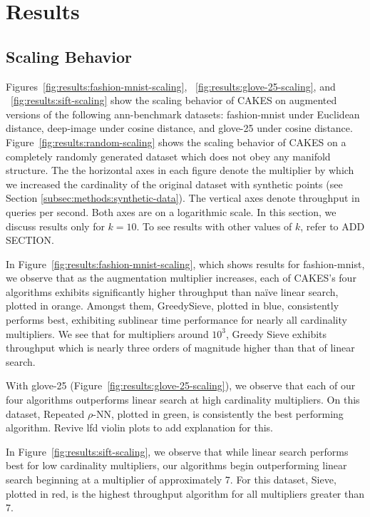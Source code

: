\section{Results}
\label{sec:results}

\subsection{Scaling Behavior}


Figures~\ref{fig:results:fashion-mnist-scaling}, ~\ref{fig:results:glove-25-scaling}, and ~\ref{fig:results:sift-scaling} show the scaling behavior of CAKES on augmented versions of the following ann-benchmark datasets: fashion-mnist under Euclidean distance, deep-image under cosine distance, and glove-25 under cosine distance. 
Figure~\ref{fig:results:random-scaling} shows the scaling behavior of CAKES on a completely randomly generated dataset which does not obey any manifold structure. 
The the horizontal axes in each figure denote the multiplier by which we increased the cardinality of the original dataset with synthetic points (see Section \ref{subsec:methods:synthetic-data}). 
The vertical axes denote throughput in queries per second. Both axes are on a logarithmic scale. In this section, we discuss results only for $k = 10$. 
To see results with other values of $k$, refer to {\color{red} ADD SECTION}.

In Figure~\ref{fig:results:fashion-mnist-scaling}, which shows results for fashion-mnist, we observe that as the augmentation multiplier increases, each of CAKES's four algorithms exhibits significantly higher throughput than na\"{i}ve linear search, plotted in orange. 
Amongst them, GreedySieve, plotted in blue, consistently performs best, exhibiting sublinear time performance for nearly all cardinality multipliers. 
We see that for multipliers around $10^3$, Greedy Sieve exhibits throughput which is nearly three orders of magnitude higher than that of linear search.


With glove-25 (Figure~\ref{fig:results:glove-25-scaling}), we observe that each of our four algorithms outperforms linear search at high cardinality multipliers. 
On this dataset, Repeated $\rho$-NN, plotted in green, is consistently the best performing algorithm. {\color{red} Revive lfd violin plots to add explanation for this.}


In Figure~\ref{fig:results:sift-scaling}, we observe that while linear search performs best for low cardinality multipliers, our algorithms begin outperforming linear search beginning at a multiplier of approximately 7. 
For this dataset, Sieve, plotted in red, is the highest throughput algorithm for all multipliers greater than 7. 

